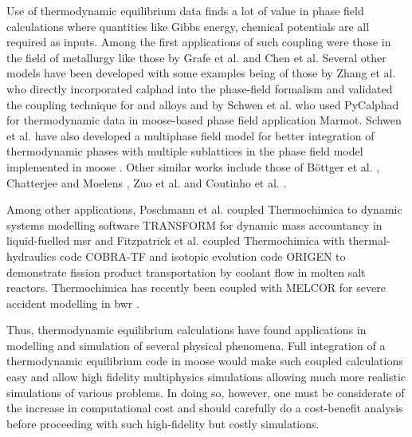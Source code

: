 	Use of thermodynamic equilibrium data finds a lot of value in phase field calculations where quantities like Gibbs energy, chemical potentials are all required as inputs. Among the first applications of such coupling were those in the field of metallurgy like those by Grafe et al. \cite{Grafe:2000aa} and Chen et al. \cite{Chen:2005aa} Several other models have been developed with some examples being of those by Zhang et al. \cite{Zhang:2015aa} who directly incorporated \gls{calphad} into the phase-field formalism and validated the coupling technique for  and  alloys and by Schwen et al. \cite{Schwen:2017aa} who used PyCalphad for thermodynamic data in  \gls{moose}-based phase field application Marmot. Schwen et al. have also developed a multiphase field model for better integration of thermodynamic phases with multiple sublattices in the phase field model implemented in \gls{moose} \cite{Schwen:2021aa}. Other similar works include those of B\"{o}ttger et al. \cite{Bottger:2020aa}, Chatterjee and Moelens \cite{Chatterjee:2021aa}, Zuo et al. \cite{Zuo:2021aa} and Coutinho et al. \cite{Coutinho:2022aa}.

	Among other applications, Poschmann et al. \cite{Poschmann:2022aa} coupled Thermochimica to dynamic systems modelling software TRANSFORM for dynamic mass accountancy in liquid-fuelled \gls{msr} and  Fitzpatrick et al. \cite{Fitzpatrick18} coupled Thermochimica with thermal-hydraulics code COBRA-TF and isotopic evolution code ORIGEN to demonstrate fission product transportation by coolant flow in molten salt reactors. Thermochimica has recently been coupled with MELCOR for severe accident modelling in \gls{bwr} \cite{Breeden:2022aa}.

	Thus, thermodynamic equilibrium calculations have found applications in modelling and simulation of several physical phenomena. Full integration of a thermodynamic equilibrium code in \gls{moose} would make such coupled calculations easy and allow high fidelity multiphysics simulations allowing much more realistic simulations of various problems. In doing so, however, one must be considerate of the increase in computational cost and should carefully do a cost-benefit analysis before proceeding with such high-fidelity but costly simulations.

